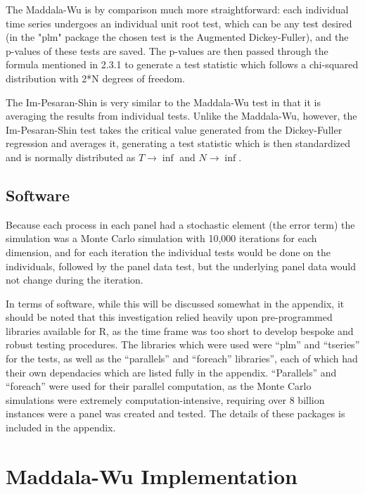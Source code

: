 The Maddala-Wu is by comparison much more straightforward: each individual time series undergoes an individual unit root test, which can be any test desired (in the "plm" package the chosen test is the Augmented Dickey-Fuller), and the p-values of these tests are saved. The p-values are then passed through the formula mentioned in 2.3.1 to generate a test statistic which follows a chi-squared distribution with 2*N degrees of freedom. 

The Im-Pesaran-Shin is very similar to the Maddala-Wu test in that it is averaging the results from individual tests. Unlike the Maddala-Wu, however, the Im-Pesaran-Shin test takes the critical value generated from the Dickey-Fuller regression and averages it, generating a test statistic which is then standardized and is normally distributed as $T \to \inf$ and $N \to \inf$.

\subsection{Software}

Because each process in each panel had a stochastic element (the error term) the simulation was a Monte Carlo simulation with 10,000 iterations for each dimension, and for each iteration the individual tests would be done on the individuals, followed by the panel data test, but the underlying panel data would not change during the iteration.

In terms of software, while this will be discussed somewhat in the appendix, it should be noted that this investigation relied heavily upon pre-programmed libraries available for R, as the time frame was too short to develop bespoke and robust testing procedures. The libraries which were used were “plm” and “tseries” for the tests, as well as the “parallels” and “foreach” libraries”, each of which had their own dependacies which are listed fully in the appendix. “Parallels” and “foreach” were used for their parallel computation, as the Monte Carlo simulations were extremely computation-intensive, requiring over 8 billion instances were a panel was created and tested. The details of these packages is included in the appendix.

\section{Maddala-Wu Implementation}

